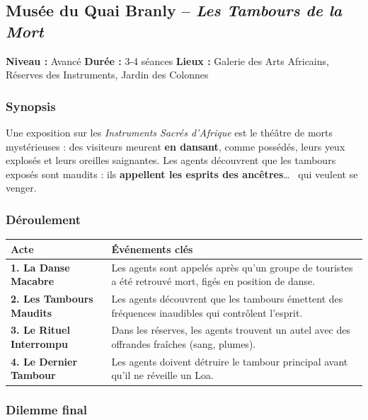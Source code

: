 \documentclass[10pt,a5paper,twoside]{book}
\begin{document}
\newpage

\subsection{Musée du Quai Branly -- \textit{Les Tambours de la Mort}}


\begin{shaded}
	\textbf{Niveau :} Avancé \quad
	\textbf{Durée :} 3-4 séances \quad
	\textbf{Lieux :} Galerie des Arts Africains, Réserves des Instruments, Jardin des Colonnes
\end{shaded}

\subsubsection*{Synopsis}

Une exposition sur les \textit{Instruments Sacrés d'Afrique} est le théâtre de morts mystérieuses : des visiteurs meurent \textbf{en dansant}, comme possédés, leurs yeux explosés et leurs oreilles saignantes. Les agents découvrent que les tambours exposés sont maudits : ils \textbf{appellent les esprits des ancêtres}\ldots~  qui veulent se venger.

\subsubsection*{Déroulement}
\begin{center}
	\begin{tabular}{|P{3cm}|P{9cm}|}
	\hline
	\textbf{Acte} 						& \textbf{Événements clés} \\ \hline
	\textbf{1. La Danse Macabre} 		& Les agents sont appelés après qu'un groupe de touristes a été retrouvé mort, figés en position de danse. \\ \hline
	\textbf{2. Les Tambours Maudits} 	& Les agents découvrent que les tambours émettent des fréquences inaudibles qui contrôlent l'esprit. \\ \hline
	\textbf{3. Le Rituel Interrompu} 	& Dans les réserves, les agents trouvent un autel avec des offrandes fraîches (sang, plumes). \\ \hline
	\textbf{4. Le Dernier Tambour} 		& Les agents doivent détruire le tambour principal avant qu'il ne réveille un Loa. \\ \hline
	\end{tabular}
\end{center}

\subsubsection*{Dilemme final}
\end{document}
